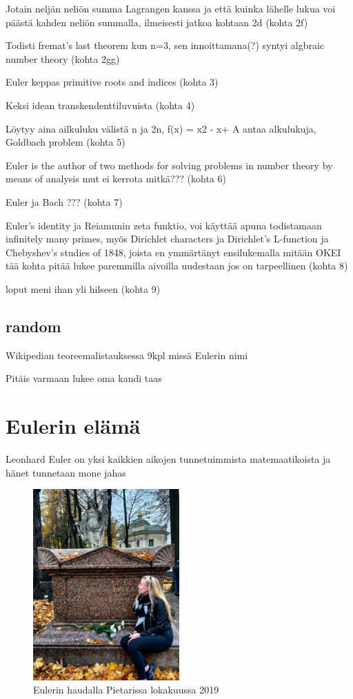 \documentclass[a4paper,11pt]{article}
\begin{document}
Jotain neljän neliön summa Lagrangen kanssa ja että kuinka lähelle lukua voi päästä kahden neliön summalla, ilmeisesti jatkoa kohtaan 2d (kohta 2f)

Todisti fremat's last theorem kun n=3, sen innoittamana(?) syntyi algbraic number theory (kohta 2gg)

Euler keppas  primitive roots and indices (kohta 3)

Keksi idean transkendenttiluvuista (kohta 4)

Löytyy aina ailkuluku välistä n ja 2n, f(x) = x2 - x+ A antaa alkulukuja, Goldbach problem (kohta 5)

Euler is the author of two methods for solving problems in number theory by means of analysis mut ei kerrota mitkä??? (kohta 6)

Euler ja Bach ??? (kohta 7)

Euler's identity ja Reiamnnin zeta funktio, voi käyttää apuna todistamaan infinitely many primes, myös Dirichlet characters ja Dirichlet’s
L-function ja Chebyshev’s studies of 1848, joista en ymmärtänyt ensilukemalla mitään OKEI tää kohta pitää lukee paremmilla aivoilla uudestaan jos on tarpeellinen (kohta 8)

loput meni ihan yli hilseen (kohta 9)

\subsection{random}

Wikipedian teoreemalistauksessa 9kpl missä Eulerin nimi

Pitäis varmaan lukee oma kandi taas



\section{Eulerin elämä}

Leonhard Euler on yksi kaikkien aikojen tunnetuimmista matemaatikoista ja hänet tunnetaan mone jahas

\begin{figure}
    \centering
    \includegraphics[bb=50 50 300 300,width=0.5\textwidth]{eulerinhauta.png}
    \caption{Eulerin haudalla Pietarissa lokakuussa 2019}
    \label{fig:hauta}
\end{figure}
\end{document}
